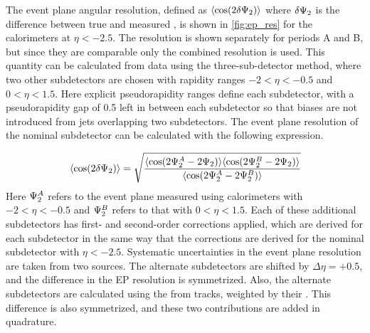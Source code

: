 The event plane angular resolution, defined as $\langle \cos(2 \delta \Psi_{2}) \rangle$ where $\delta \Psi_{2}$ is the difference between true and measured \psit, is shown in \cref{fig:ep_res} for the calorimeters at $\eta < -2.5$.
The resolution is shown separately for periods A and B, but since they are comparable only the combined resolution is used.
This quantity can be calculated from data using the three-sub-detector method, where two other subdetectors are chosen with rapidity ranges $-2 < \eta< -0.5$ and $0 < \eta < 1.5$.
Here explicit pseudorapidity ranges define each subdetector, with a pseudorapidity gap of 0.5 left in between each subdetector so that biases are not introduced from jets overlapping two subdetectors.
The event plane resolution of the nominal subdetector can be calculated with the following expression.

\begin{equation}
\langle \cos(2 \delta \Psi_{2}) \rangle = \sqrt{ \frac{\langle \cos(2\Psi_{2}^A - 2\Psi_{2}) \rangle \langle \cos(2\Psi_{2}^B - 2\Psi_{2}) \rangle }{\langle \cos(2\Psi_{2}^A - 2\Psi_{2}^B) \rangle} }\\
\end{equation}
Here $\Psi_{2}^A$ refers to the event plane measured using calorimeters with $-2 < \eta< -0.5$ and $\Psi_{2}^B$ refers to that with $0 < \eta < 1.5$.
Each of these additional subdetectors has first- and second-order corrections applied, which are derived for each subdetector in the same way that the corrections are derived for the nominal subdetector with $\eta < -2.5$.
Systematic uncertainties in the event plane resolution are taken from two sources.
The alternate subdetectors are shifted by $\Delta\eta = +0.5$, and the difference in the EP resolution is symmetrized.
Also, the alternate subdetectors are calculated using the \qt from tracks, weighted by their \pt. This difference is also symmetrized, and these two contributions are added in quadrature.

